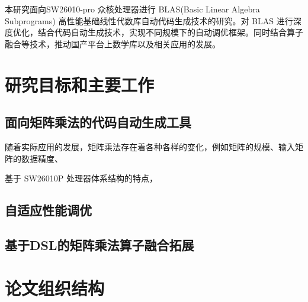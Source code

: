 本研究面向SW26010-pro 众核处理器进行 BLAS(Basic Linear Algebra Subprograms) 高性能基础线性代数库自动代码生成技术的研究。对 BLAS 进行深度优化，结合代码自动生成技术，实现不同规模下的自动调优框架。同时结合算子融合等技术，推动国产平台上数学库以及相关应用的发展。

\section{研究目标和主要工作}

\subsection{面向矩阵乘法的代码自动生成工具}

随着实际应用的发展，矩阵乘法存在着各种各样的变化，例如矩阵的规模、输入矩阵的数据精度、

基于 SW26010P 处理器体系结构的特点，


\subsection{自适应性能调优}


\subsection{基于DSL的矩阵乘法算子融合拓展}


\section{论文组织结构}
